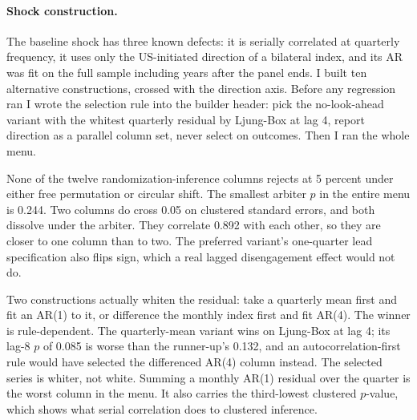 \documentclass[11pt]{article}
\begin{document}
\paragraph{Shock construction.} The baseline shock has three known defects: it
is serially correlated at quarterly frequency, it uses only the US-initiated
direction of a bilateral index, and its AR was fit on the full sample including
years after the panel ends. I built ten alternative constructions, crossed with
the direction axis. Before any regression ran I wrote the selection rule into
the builder header: pick the no-look-ahead variant with the whitest quarterly
residual by Ljung-Box at lag 4, report direction as a parallel column set,
never select on outcomes. Then I ran the whole menu.

None of the twelve randomization-inference columns rejects at 5 percent under
either free permutation or circular shift. The smallest arbiter $p$ in the
entire menu is 0.244. Two columns do cross 0.05 on clustered standard errors,
and both dissolve under the arbiter. They correlate 0.892 with each other, so
they are closer to one column than to two. The preferred variant's one-quarter
lead specification also flips sign, which a real lagged disengagement effect
would not do.

Two constructions actually whiten the residual: take a quarterly mean first and
fit an AR(1) to it, or difference the monthly index first and fit AR(4). The
winner is rule-dependent. The quarterly-mean variant wins on Ljung-Box at lag
4; its lag-8 $p$ of 0.085 is worse than the runner-up's 0.132, and an
autocorrelation-first rule would have selected the differenced AR(4) column
instead. The selected series is whiter, not white. Summing a monthly AR(1)
residual over the quarter is the worst column in the menu. It also carries the
third-lowest clustered $p$-value, which shows what serial correlation does to
clustered inference.
\end{document}

